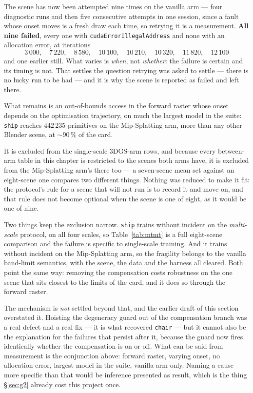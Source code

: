 The scene has now been attempted nine times on the vanilla arm --- four
diagnostic runs and then five consecutive attempts in one session, since a fault
whose onset moves is a fresh draw each time, so retrying it is a measurement. \textbf{All nine failed}, every one with
\texttt{cudaErrorIllegalAddress} and none with an allocation error, at
iterations
\[
  3\,000,\quad 7\,220,\quad 8\,580,\quad 10\,100,\quad 10\,210,\quad
  10\,320,\quad 11\,820,\quad 12\,100
\]
and one earlier still. What varies is \emph{when}, not \emph{whether}: the
failure is certain and its timing is not. That settles the question retrying was
asked to settle --- there is no lucky run to be had --- and it is why the scene
is reported as failed and left there.

What remains is an out-of-bounds access in the forward raster whose onset
depends on the optimisation trajectory, on much the largest model in the suite:
\texttt{ship} reaches $442\,235$ primitives on the Mip-Splatting arm, more than any other
Blender scene, at $\sim\!90\,\%$ of the card.

It is excluded from the single-scale 3DGS-arm rows, and because every
between-arm
table in this chapter is restricted to the scenes both arms have, it is excluded
from the Mip-Splatting arm's there too --- a seven-scene mean set against an eight-scene one compares two different things. Nothing was reduced to make it fit: the protocol's rule for a scene
that will not run is to record it and move on, and that rule does not become
optional when the scene is one of eight, as it would be one of nine.

Two things keep the exclusion narrow. \texttt{ship}
trains without incident on the \emph{multi-scale} protocol, on all four scales,
so Table~\ref{tab:mtmt} is a full eight-scene comparison and the failure is
specific to single-scale training. And it trains without incident on the Mip-Splatting arm, so
the fragility belongs to the vanilla band-limit semantics, with the scene, the
data and the harness all cleared. Both point the same way: removing the
compensation costs robustness on the one scene that sits closest to the limits of
the card, and it does so through the forward raster.

The mechanism is \emph{not} settled beyond that, and the earlier draft of this
section overstated it. Hoisting the degeneracy guard out of the compensation
branch was a real defect and a real fix --- it is what recovered \texttt{chair}
--- but it cannot also be the explanation for the failures that persist after
it, because the guard now fires identically whether the compensation is on or
off. What can be said from measurement is the conjunction above: forward raster,
varying onset, no allocation error, largest model in the suite, vanilla arm
only. Naming a cause more specific than that would be inference presented as
result, which is the thing \S\ref{sec:g2} already cost this project once.

